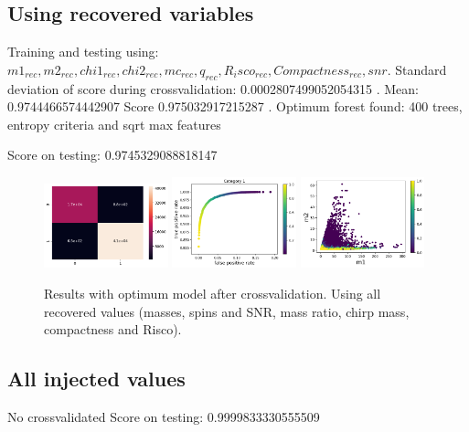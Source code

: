 \documentclass[prd,aps,twocolumn,a4paper,showkeys,nofootinbib]{revtex4-2}
\begin{document}
\subsection{Using recovered variables}
Training and testing using: $m1_{rec}, m2_{rec}, chi1_{rec}, chi2_{rec}, mc_{rec}, q_{rec}, R_isco_{rec}, Compactness_{rec}, snr$.
Standard deviation of score during crossvalidation:  0.0002807499052054315 . Mean:  0.9744466574442907
Score  0.975032917215287 . Optimum forest found:  400  trees,  entropy  criteria and  sqrt  max features

Score on testing:  0.9745329088818147


\begin{figure}[]
\includegraphics[width=0.32\textwidth]{./FigNSclass/CM_RecCross}
\includegraphics[width=0.32\textwidth]{./FigNSclass/rocCurve_RecCross}
\includegraphics[width=0.32\textwidth]{./FigNSclass/scatterplot_RecCross}
\caption{\label{fig:indreccross} Results with optimum model after crossvalidation. Using all recovered values (masses, spins and SNR, mass ratio, chirp mass, compactness and Risco).}
\end{figure}

\subsection{All injected values}
No crossvalidated
Score on testing:  0.9999833330555509
\end{document}
